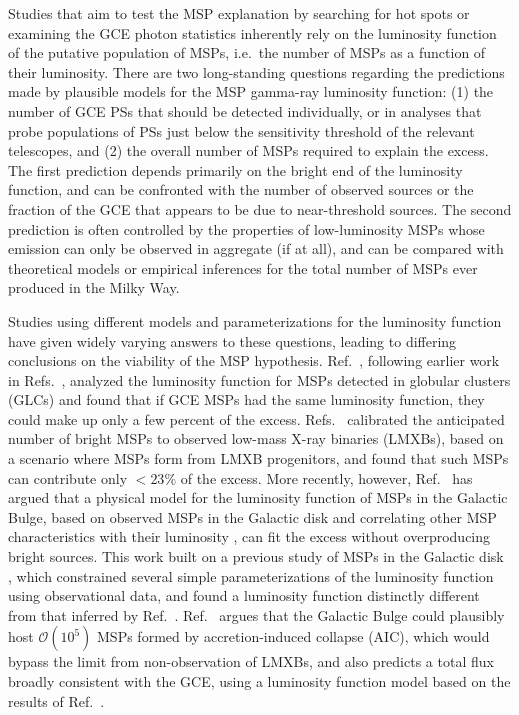 \documentclass[letter,11pt]{article}
\begin{document}
Studies that aim to test the MSP explanation by searching for hot spots or examining the GCE photon statistics inherently rely on the luminosity function of the putative population of MSPs, i.e.~the number of MSPs as a function of their luminosity. There are two long-standing questions regarding the predictions made by plausible models for the MSP gamma-ray luminosity function: (1) the number of GCE PSs that should be detected individually, or in analyses that probe populations of PSs just below the sensitivity threshold of the relevant telescopes, and (2) the overall number of MSPs required to explain the excess. The first prediction depends primarily on the bright end of the luminosity function, and can be confronted with the number of observed sources or the fraction of the GCE that appears to be due to near-threshold sources. The second prediction is often controlled by the properties of low-luminosity MSPs whose emission can only be observed in aggregate (if at all), and can be compared with theoretical models or empirical inferences for the total number of MSPs ever produced in the Milky Way.

Studies using different models and parameterizations for the luminosity function have given widely varying answers to these questions, leading to differing conclusions on the viability of the MSP hypothesis. Ref.~\cite{Hooper16}, following earlier work in Refs.~\cite{Cholis:2014noa, Hooper:2015jlu}, analyzed the luminosity function for MSPs detected in globular clusters (GLCs) and found that if GCE MSPs had the same luminosity function, they could make up only a few percent of the excess. Refs.~\cite{Cholis:2014lta, Haggard:2017lyq} calibrated the anticipated number of bright MSPs to observed low-mass X-ray binaries (LMXBs), based on a scenario where MSPs form from LMXB progenitors, and found that such MSPs can contribute only $<23\%$ of the excess. More recently, however, Ref.~\cite{Ploeg:2020jeh} has argued that a physical model for the luminosity function of MSPs in the Galactic Bulge, based on observed MSPs in the Galactic disk and correlating other MSP characteristics with their luminosity \cite{Kalapotharakos:2019cio}, can fit the excess without overproducing bright sources. This work built on a previous study of MSPs in the Galactic disk \cite{Bartels:2018xom}, which constrained several simple parameterizations of the luminosity function using observational data, and found a luminosity function distinctly different from that inferred by Ref.~\cite{Hooper16}. Ref.~\cite{Gautam:2021wqn} argues that the Galactic Bulge could plausibly host $\mathcal{O}(10^5)$ MSPs formed by accretion-induced collapse (AIC), which would bypass the limit from non-observation of LMXBs, and also predicts a total flux broadly consistent with the GCE, using a luminosity function model based on the results of Ref.~\cite{Ploeg:2020jeh}.
\end{document}

